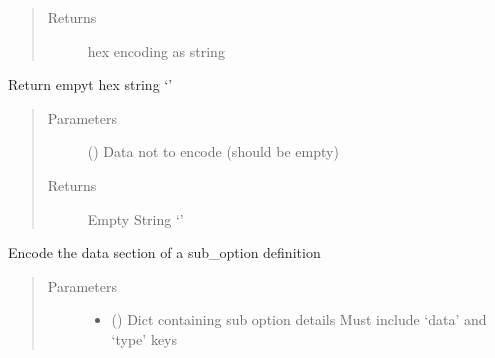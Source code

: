 \documentclass[letterpaper,10pt,english]{sphinxmanual}
\begin{document}
\begin{fulllineitems}
\begin{fulllineitems}
\begin{quote}
\begin{description}
\item[{Returns}] \leavevmode
\sphinxAtStartPar
hex encoding as string

\end{description}\end{quote}

\end{fulllineitems}


\begin{fulllineitems}
\label{\detokenize{dhcp_encode-class:bloxone.dhcp_encode.empty_to_hex}}
\sphinxAtStartPar
Return empyt hex string ‘’
\begin{quote}\begin{description}
\item[{Parameters}] \leavevmode
\sphinxAtStartPar
{} () \textendash{} Data not to encode (should be empty)

\item[{Returns}] \leavevmode
\sphinxAtStartPar
Empty String ‘’

\end{description}\end{quote}

\end{fulllineitems}


\begin{fulllineitems}
\label{\detokenize{dhcp_encode-class:bloxone.dhcp_encode.encode_data}}
\sphinxAtStartPar
Encode the data section of a sub\_option definition
\begin{quote}\begin{description}
\item[{Parameters}] \leavevmode\begin{itemize}
\item {} 
\sphinxAtStartPar
{} () \textendash{} Dict containing sub option details
Must include ‘data’ and ‘type’ keys


\end{itemize}
\end{description}
\end{quote}
\end{fulllineitems}
\end{fulllineitems}
\end{document}
